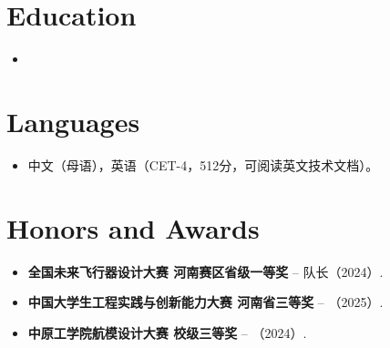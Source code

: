 \documentclass[11pt,a4paper,sans]{moderncv}
\begin{document}

\section{Education}
\vspace{1pt}
\begin{itemize}

\item{}

\end{itemize}


\section{Languages}
\vspace{1pt}
\begin{itemize}
\item 中文（母语），英语（CET-4，512分，可阅读英文技术文档）。
\end{itemize}


\section{Honors and Awards}
\vspace{1pt}
\begin{itemize}
\item{\textbf{全国未来飞行器设计大赛 河南赛区省级一等奖} -- 队长（2024）.}
\item{\textbf{中国大学生工程实践与创新能力大赛 河南省三等奖} -- （2025）.}
\item{\textbf{中原工学院航模设计大赛 校级三等奖} -- （2024）.}
\end{itemize}


\end{document}

